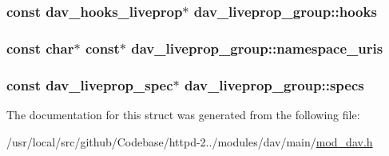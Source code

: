 \subsubsection[{\texorpdfstring{hooks}{hooks}}]{\setlength{\rightskip}{0pt plus 5cm}const {\bf dav\+\_\+hooks\+\_\+liveprop}$\ast$ dav\+\_\+liveprop\+\_\+group\+::hooks}\hypertarget{structdav__liveprop__group_a1f5011b88b2fde463a2b1e19fa4f4243}{}\label{structdav__liveprop__group_a1f5011b88b2fde463a2b1e19fa4f4243}
\subsubsection[{\texorpdfstring{namespace\+\_\+uris}{namespace_uris}}]{\setlength{\rightskip}{0pt plus 5cm}const char$\ast$ const$\ast$ dav\+\_\+liveprop\+\_\+group\+::namespace\+\_\+uris}\hypertarget{structdav__liveprop__group_a6139603da47002c85469892051764b20}{}\label{structdav__liveprop__group_a6139603da47002c85469892051764b20}
\subsubsection[{\texorpdfstring{specs}{specs}}]{\setlength{\rightskip}{0pt plus 5cm}const {\bf dav\+\_\+liveprop\+\_\+spec}$\ast$ dav\+\_\+liveprop\+\_\+group\+::specs}\hypertarget{structdav__liveprop__group_afc73cae0d952870764fd8c0e9cb03907}{}\label{structdav__liveprop__group_afc73cae0d952870764fd8c0e9cb03907}


The documentation for this struct was generated from the following file\+:\begin{DoxyCompactItemize}
\item 
/usr/local/src/github/\+Codebase/httpd-\/2../modules/dav/main/\hyperlink{mod__dav_8h}{mod\+\_\+dav.\+h}\end{DoxyCompactItemize}
